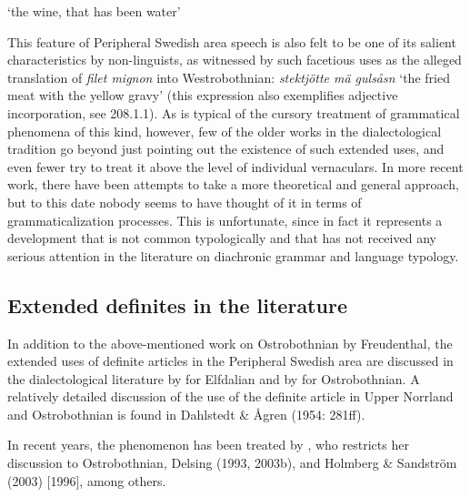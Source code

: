 \begin{styleTranslation}
‘the wine, that has been water’

\end{styleTranslation}

\begin{styleBodyTextFirst}
This feature of Peripheral Swedish area speech is also felt to be one of its salient characteristics by non-linguists, as witnessed by such facetious uses as the alleged translation of \textit{filet mignon }into Westrobothnian: \textit{stektjötte mä gulsåsn} ‘the fried meat with the yellow gravy’ (this expression also exemplifies adjective incorporation, see 208.1.1). As is typical of the cursory treatment of grammatical phenomena of this kind, however, few of the older works in the dialectological tradition go beyond just pointing out the existence of such extended uses, and even fewer try to treat it above the level of individual vernaculars. In more recent work, there have been attempts to take a more theoretical and general approach, but to this date nobody seems to have thought of it in terms of grammaticalization processes. This is unfortunate, since in fact it represents a development that is not common typologically and that has not received any serious attention in the literature on diachronic grammar and language typology.

\end{styleBodyTextFirst}

\subsection{\rmfamily Extended definites in the literature}

\begin{styleBodyTextFirst}
In addition to the above-mentioned work on Ostrobothnian by Freudenthal, the extended uses of definite articles in the Peripheral Swedish area are discussed in the dialectological literature by \citet{Levander1909} for Elfdalian and by \citet{Hummelstedt1934} for Ostrobothnian. A relatively detailed discussion of the use of the definite article in Upper Norrland and Ostrobothnian is found in Dahlstedt \& Ågren (1954: 281ff). 

\end{styleBodyTextFirst}

\begin{styleBodytextC}
In recent years, the phenomenon has been treated by \citet{Nikula1997}, who restricts her discussion to Ostrobothnian, Delsing (1993, 2003b), and Holmberg \& Sandström (2003) [1996], among others.

\end{styleBodytextC}

